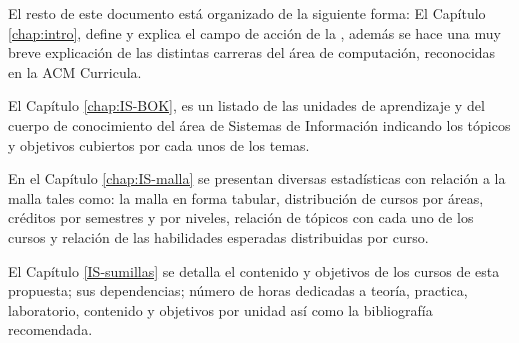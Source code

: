 \OtherKeyStones

El resto de este documento está organizado de la siguiente forma: 
El Capí­tulo \ref{chap:intro}, define y explica el campo de acción 
de la \SchoolShortName, además se hace una muy breve explicación de las 
distintas carreras del área de computación, reconocidas en la ACM Curricula.

% 

% 
% 

El Capí­tulo \ref{chap:IS-BOK}, es un listado de las unidades de aprendizaje y 
del cuerpo de conocimiento del área de Sistemas de Información indicando los 
tópicos y objetivos cubiertos por cada unos de los temas.

En el Capí­tulo \ref{chap:IS-malla} se presentan diversas estadí­sticas con 
relación a la malla tales como: la malla en forma tabular, distribución de 
cursos por áreas, créditos por semestres y por niveles, relación de tópicos 
con cada uno de los cursos y relación de las habilidades esperadas distribuidas 
por curso.

El Capí­tulo \ref{IS-sumillas} se detalla el contenido y objetivos de los cursos 
de esta propuesta; sus dependencias; número de horas dedicadas a teorí­a, practica, 
laboratorio, contenido y objetivos por unidad así­ como la bibliografí­a recomendada.

